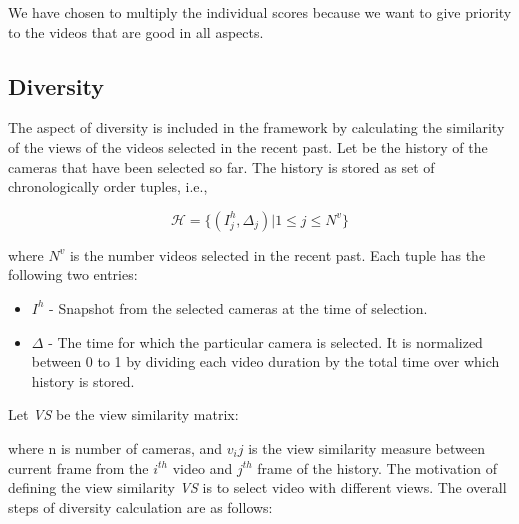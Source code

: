 \documentclass{sig-alternate}
\begin{document}
We have chosen to multiply the individual scores because we
want to give priority to the videos that are good in all aspects.

\subsection{Diversity}

The aspect of diversity is included in the framework by calculating the similarity of the views of the videos selected in the recent past. Let  be the history of the cameras that have been selected so far. The history is stored as set of chronologically order tuples, i.e.,

\begin{equation}
    \mathcal{H} = \{(I_{j}^{h} , \Delta _j )|1 \leq j \leq N^v\}
\end{equation}

where $N^v$ is the number videos selected in the recent past. Each
tuple has the following two entries:

\begin{itemize}
    \item $I^h$ - Snapshot from the selected cameras at the time of selection.
    \item   $\Delta$ - The time for which the particular camera is selected. It is normalized between 0 to 1 by dividing each video duration by the total time over which history is stored.
    
    
\end{itemize}

Let \textit{VS} be the view similarity matrix:

where n is number of cameras, and $v_ij$ is the view similarity measure between current frame from the $i^{th}$ video and $j^{th}$ frame of the history. The motivation of defining the view similarity \textit{VS} is to select video with different views. The overall steps of diversity calculation are as follows:
\end{document}
